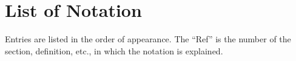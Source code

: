 %
%
%
%

\chapter*{List of Notation}\label{C.notation}

Entries are listed in the order of appearance.  The ``Ref'' is the number of the
section, definition, etc., in which the notation is explained.

\vspace{0.5cm}

